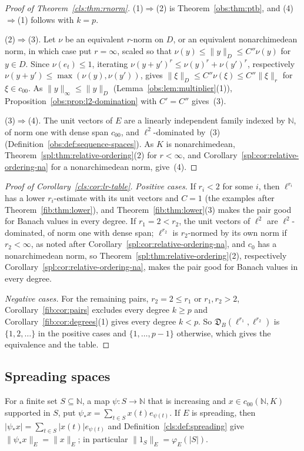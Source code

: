 \documentclass[11pt]{amsart}
\theoremstyle{definition}
\theoremstyle{remark}
\numberwithin{equation}{section}
\newcommand{\N}{\mathbb N}
\newcommand{\abs}[1]{\lvert #1\rvert}
\newcommand{\norm}[1]{\lVert #1\rVert}
\theoremstyle{plain}
\theoremstyle{definition}
\theoremstyle{plain}
\newcommand{\fD}{\mathfrak D}
\begin{document}
\begin{proof}[Proof of Theorem~\ref{cls:thm:rnorm}]
(1)$\Rightarrow$(2) is Theorem~\ref{obs:thm:ptb}, and (4)$\Rightarrow$(1) follows with $k=p$.

(2)$\Rightarrow$(3). Let $\nu$ be an equivalent $r$\nobreakdash-norm on $D$, or an equivalent nonarchimedean norm, in
which case put $r=\infty$, scaled so that $\nu(y)\le\norm y_D\le C''\nu(y)$ for $y\in D$. Since $\nu(e_t)\le1$, iterating
$\nu(y+y')^r\le\nu(y)^r+\nu(y')^r$, respectively $\nu(y+y')\le\max(\nu(y),\nu(y'))$, gives
$\norm\xi_D\le C''\nu(\xi)\le C''\norm\xi_r$ for $\xi\in c_{00}$. As $\norm y_\infty\le\norm y_D$
(Lemma~\ref{obs:lem:multiplier}(1)), Proposition~\ref{obs:prop:l2-domination} with $C'=C''$ gives~(3).

(3)$\Rightarrow$(4). The unit vectors of $E$ are a linearly independent family indexed by $\N$, of norm one with dense
span $c_{00}$, and $\ell^2$\nobreakdash-dominated by~(3) (Definition~\ref{obs:def:sequence-spaces}). As $K$ is
nonarchimedean, Theorem~\ref{spl:thm:relative-ordering}(2) for $r<\infty$, and
Corollary~\ref{spl:cor:relative-ordering-na} for a nonarchimedean norm, give~(4).
\end{proof}

\begin{proof}[Proof of Corollary~\ref{cls:cor:lr-table}]
\emph{Positive cases.} If $r_i<2$ for some $i$, then $\ell^{r_i}$ has a lower $r_i$\nobreakdash-estimate with its unit
vectors and $C=1$ (the examples after Theorem~\ref{fib:thm:lower}), and Theorem~\ref{fib:thm:lower}(3) makes the pair good
for Banach values in every degree. If $r_1=2<r_2$, the unit vectors of $\ell^2$ are $\ell^2$\nobreakdash-dominated, of norm one
with dense span; $\ell^{r_2}$ is $r_2$\nobreakdash-normed by its own norm if $r_2<\infty$, as noted
after Corollary~\ref{spl:cor:relative-ordering-na}, and $c_0$ has a nonarchimedean norm, so
Theorem~\ref{spl:thm:relative-ordering}(2), respectively Corollary~\ref{spl:cor:relative-ordering-na}, makes the pair good
for Banach values in every degree.

\emph{Negative cases.} For the remaining pairs, $r_2=2\le r_1$ or $r_1,r_2>2$, Corollary~\ref{fib:cor:pairs}
excludes every degree $k\ge p$ and Corollary~\ref{fib:cor:degrees}(1) gives every degree $k<p$. So
$\fD_B(\ell^{r_1},\ell^{r_2})$ is $\{1,2,\dots\}$ in the positive cases and $\{1,\dots,p-1\}$ otherwise, which gives the
equivalence and the table.
\end{proof}

\subsection{Spreading spaces}\label{frc:ssec:spreading}
For a finite set $S\subseteq\N$, a map $\psi\colon S\to\N$ that is increasing and $x\in c_{00}(\N,K)$ supported in $S$,
put $\psi_*x=\sum_{t\in S}x(t)e_{\psi(t)}$. If $E$ is spreading, then $\abs{\psi_*x}=\sum_{t\in S}\abs{x(t)}e_{\psi(t)}$
and Definition~\ref{cls:def:spreading} give $\norm{\psi_*x}_E=\norm x_E$; in particular $\norm{1_S}_E=\varphi_E(\abs S)$.
\end{document}
